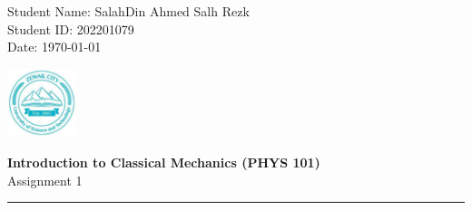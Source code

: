 \documentclass[11pt,letterpaper]{article}
\begin{document}
\pagestyle{plain}

\begin{flushleft}
Student Name: SalahDin Ahmed Salh Rezk\\
Student ID: 202201079 \\
Date: \today
\end{flushleft}

\begin{flushright}\vspace{-15mm}
\includegraphics[height=2cm]{zcust.jpg}
\end{flushright}
 
\begin{center}\vspace{-1cm}
\textbf{\large Introduction to Classical Mechanics (PHYS 101)}\\
Assignment 1
\end{center}

 
\rule{\linewidth}{0.1mm}

\bigskip
\bigskip
\end{document}
